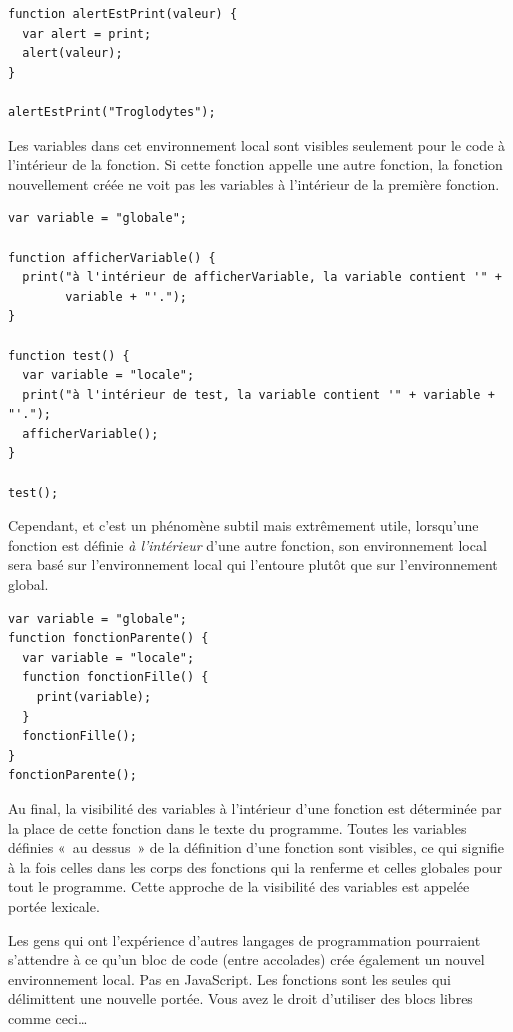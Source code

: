 \documentclass{FramateX}
\begin{document}
\begin{lstlisting}
function alertEstPrint(valeur) {
  var alert = print;
  alert(valeur);
}

alertEstPrint("Troglodytes");
\end{lstlisting}
Les variables dans cet environnement local sont visibles seulement pour
le code à l'intérieur de la fonction. Si cette fonction appelle une
autre fonction, la fonction nouvellement créée ne voit pas les variables
à l'intérieur de la première fonction.

\begin{lstlisting}
var variable = "globale";

function afficherVariable() {
  print("à l'intérieur de afficherVariable, la variable contient '" +
        variable + "'.");
}

function test() {
  var variable = "locale";
  print("à l'intérieur de test, la variable contient '" + variable + "'.");
  afficherVariable();
}

test();
\end{lstlisting}
Cependant, et c'est un phénomène subtil mais extrêmement utile,
lorsqu'une fonction est définie \emph{à l'intérieur} d'une autre
fonction, son environnement local sera basé sur l'environnement local
qui l'entoure plutôt que sur l'environnement global.

\begin{lstlisting}
var variable = "globale";
function fonctionParente() {
  var variable = "locale";
  function fonctionFille() {
    print(variable);
  }
  fonctionFille();
}
fonctionParente();
\end{lstlisting}
Au final, la visibilité des variables à l'intérieur d'une fonction est
déterminée par la place de cette fonction dans le texte du programme.
Toutes les variables définies «~au dessus~» de la définition d'une
fonction sont visibles, ce qui signifie à la fois celles dans les corps
des fonctions qui la renferme et celles globales pour tout le programme.
Cette approche de la visibilité des variables est appelée portée
lexicale.

\begin{center}\end{center}

Les gens qui ont l'expérience d'autres langages de programmation
pourraient s'attendre à ce qu'un bloc de code (entre accolades) crée
également un nouvel environnement local. Pas en JavaScript. Les
fonctions sont les seules qui délimittent une nouvelle portée. Vous avez
le droit d'utiliser des blocs libres comme ceci\ldots{}
\end{document}
